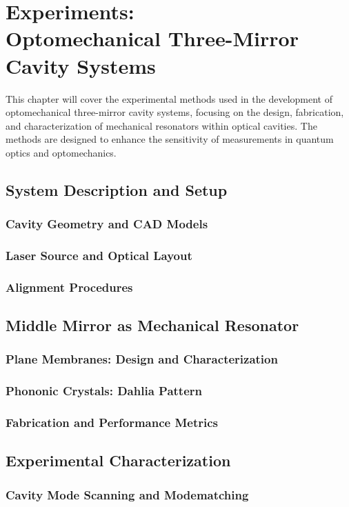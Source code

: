 \chapter{Experiments: \\ Optomechanical Three-Mirror Cavity Systems}
This chapter will cover the experimental methods used in the development of optomechanical three-mirror cavity systems, focusing on the design, fabrication, and characterization of mechanical resonators within optical cavities. The methods are designed to enhance the sensitivity of measurements in quantum optics and optomechanics.
\minitoc
\newpage 
\section{System Description and Setup}
\subsection{Cavity Geometry and CAD Models}
\subsection{Laser Source and Optical Layout}
\subsection{Alignment Procedures}
\section{Middle Mirror as Mechanical Resonator}
\subsection{Plane Membranes: Design and Characterization}
\subsection{Phononic Crystals: Dahlia Pattern}
\subsection{Fabrication and Performance Metrics}
\section{Experimental Characterization}
\subsection{Cavity Mode Scanning and Modematching}
